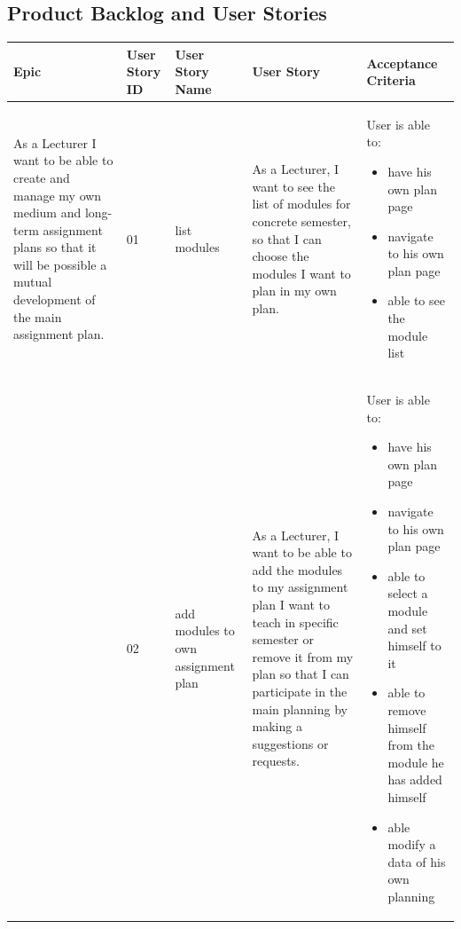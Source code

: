\documentclass{scrartcl}
\begin{document}
\subsection{Product Backlog and User Stories}
\begin{table}[H]
\begin{center}
\begin{tabular}{|p{4cm}|p{0.5cm} |p{3cm}|p{4cm}|p{4cm}|}
\hline
\rowcolor{LightCyan}
 \textbf{Epic} &\textbf{ User Story ID} &\textbf{User Story Name} &\textbf{User Story}  & \textbf{Acceptance Criteria} \\
\hline


As a Lecturer I want to be able to create
and manage my own medium and long-term assignment plans so that it will be  possible a mutual development of the main assignment plan. &
01 &
list modules &
 As a Lecturer, I want to see the list of modules for concrete semester, so that I can choose the modules I want to plan in my own plan. &
 
  User is able to:            
\begin{itemize}
\item have his own plan page
\item navigate to his own plan page
\item able to see the module list
\end{itemize}                                                            \\ \hline

 &
 02&
 add modules to own assignment plan&
 
As a Lecturer, I want to be able to add the modules to my assignment plan I want to teach in specific semester or remove  it from my plan so that I can participate in the main planning by making a suggestions or requests.                  &

 User is able to:            
\begin{itemize}
\item have his own plan page
\item navigate to his own plan page
\item able to select a module and set himself to it
\item able to remove himself from the module he has added himself
\item able modify a data of his own planning 
\end{itemize}                                         \\ \hline




\end{tabular}
\end{center}
\end{table}
\end{document}
